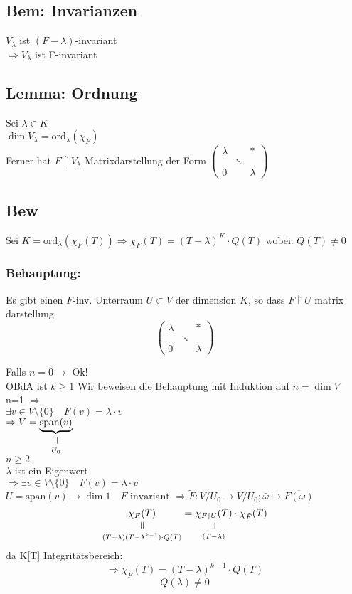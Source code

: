 \documentclass[titlepage,12pt,a4paper,ngerman]{report}
\newcommand{\verteq}{\rotatebox{90}{$\,=$}}
\newcommand{\equalto}[2]{\underset{\scriptstyle\overset{\mkern4mu\verteq}{#2}}{#1}}
\newcommand{\tx}[1]{\textrm{#1}}
\newcommand{\ov}[1]{\overline{#1}}
\newcommand{\spa}{\tx{span}}
\newcommand{\ord}{\tx{ord}}
\begin{document}
\subsection{Bem: Invarianzen}
$V_\lambda $ ist $(F-\lambda)$-invariant\\
$\Rightarrow V_\lambda$ ist F-invariant
\subsection{Lemma: Ordnung}
Sei $\lambda \in K $\\
$\dim V_\lambda = \ord_\lambda (\chi_F)$\\
Ferner hat $ F \upharpoonright V_\lambda $ Matrixdarstellung der Form
$\begin{pmatrix}
\lambda & & * \\
& \ddots \\
0 & & \lambda
\end{pmatrix}$

\subsection{Bew}
Sei $K = \tx{ord}_\lambda ( \chi_F(T))
\Rightarrow \chi_F (T) = (T - \lambda)^K \cdot Q(T)$ wobei: $Q(T) \neq 0$ 
\subsubsection{Behauptung:}
Es gibt einen $F$-inv. Unterraum $U \subset V$ der dimension $K$, so dass $F \upharpoonright U$ matrix darstellung $$\begin{pmatrix}
\lambda & & * \\ & \ddots & \\ 0 & & \lambda
\end{pmatrix}$$

Falls $ n=0  \rightarrow $ Ok!\\
OBdA ist $ k\ge 1 $ Wir beweisen die Behauptung mit Induktion auf $ n = \dim V $\\
n=1 $\Rightarrow$\\
$\exists v \in V\setminus \{0\} \quad F(v) = \lambda \cdot v$\\
$\Rightarrow V = \equalto{\underbrace{\spa (v)}}{U_0}$\\
$n\ge 2$\\
$\lambda$ ist ein Eigenwert\\
$\Rightarrow \exists v \in V \setminus \{0\} \quad F(v) = \lambda\cdot v$\\
$U = \spa (v) \rightarrow \dim 1 \quad F\tx{-invariant}$
$\Rightarrow\tilde{F}: V/U_0 \rightarrow V/U_0 ; \bar{\omega} \mapsto \ov{F(\omega)}$
$$\equalto{\chi_F(T)}{(T-\lambda)(T-\lambda^{k-1}) \cdot Q(T)} = \equalto{\chi_{F \upharpoonright U}(T)}{(T-\lambda)} \cdot \chi_{\tilde{F}}(T)$$
da K[T] Integritätsbereich:
$$\Rightarrow \chi_{\tilde{F}} (T) = (T-\lambda)^{k-1} \cdot Q(T)$$
$$ Q(\lambda)\neq 0$$
\end{document}
